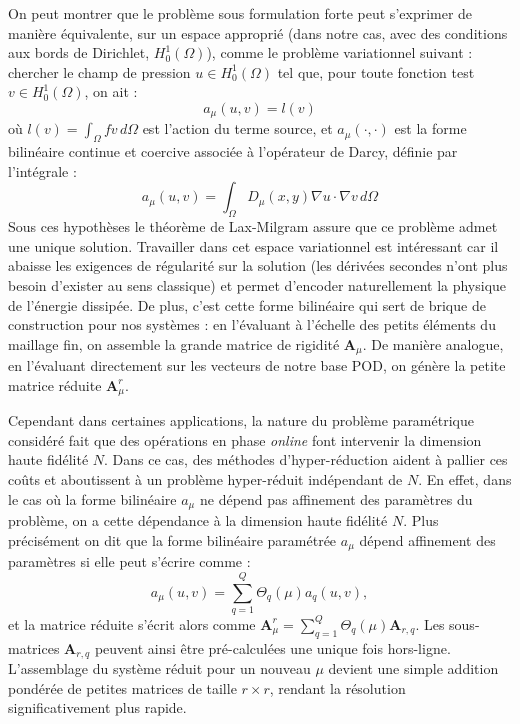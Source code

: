 \documentclass[12pt,a4paper]{article}
\begin{document}
On peut montrer que le problème sous formulation forte peut s'exprimer de manière équivalente, sur un espace approprié (dans notre cas, avec des conditions aux bords de Dirichlet, $H_0^1(\Omega)$), comme le problème variationnel suivant : chercher le champ de pression $u \in H_0^1(\Omega)$ tel que, pour toute fonction test $v \in H_0^1(\Omega)$, on ait :
\begin{equation*}
    a_\mu(u, v) = l(v)
\end{equation*}
où $l(v) = \int_{\Omega} f v \, d\Omega$ est l'action du terme source, et $a_\mu(\cdot, \cdot)$ est la forme bilinéaire continue et coercive associée à l'opérateur de Darcy, définie par l'intégrale :
\begin{equation*}
    a_\mu(u, v) = \int_{\Omega} D_\mu(x,y) \nabla u \cdot \nabla v \, d\Omega
\end{equation*}
Sous ces hypothèses le théorème de Lax-Milgram assure que ce problème admet une unique solution. Travailler dans cet espace variationnel est intéressant car il abaisse les exigences de régularité sur la solution (les dérivées secondes n'ont plus besoin d'exister au sens classique) et permet d'encoder naturellement la physique de l'énergie dissipée. De plus, c'est cette forme bilinéaire qui sert de brique de construction pour nos systèmes : en l'évaluant à l'échelle des petits éléments du maillage fin, on assemble la grande matrice de rigidité $\mathbf{A}_\mu$. De manière analogue, en l'évaluant directement sur les vecteurs de notre base POD, on génère la petite matrice réduite $\mathbf{A}^r_\mu$.

Cependant dans certaines applications, la nature du problème paramétrique considéré fait que des opérations en phase \textit{online} font intervenir la dimension haute fidélité $N$. Dans ce cas, des méthodes d'hyper-réduction aident à pallier ces coûts et aboutissent à un problème hyper-réduit indépendant de $N$.
En effet, dans le cas où la forme bilinéaire $a_\mu$ ne dépend pas affinement des paramètres du problème, on a cette dépendance à la dimension haute fidélité $N$. Plus précisément on dit que la forme bilinéaire paramétrée $a_\mu$ dépend affinement des paramètres si elle peut s'écrire comme :
\begin{equation*}
    a_\mu(u, v) = \sum_{q=1}^Q \Theta_q(\mu) a_q(u, v),
\end{equation*}
et la matrice réduite s'écrit alors comme $\mathbf{A}^r_\mu = \sum_{q=1}^Q \Theta_q(\mu) \mathbf{A}_{r,q}$. Les sous-matrices $\mathbf{A}_{r,q}$ peuvent ainsi être pré-calculées une unique fois hors-ligne. L'assemblage du système réduit pour un nouveau $\mu$ devient une simple addition pondérée de petites matrices de taille $r \times r$, rendant la résolution significativement plus rapide.
\end{document}
